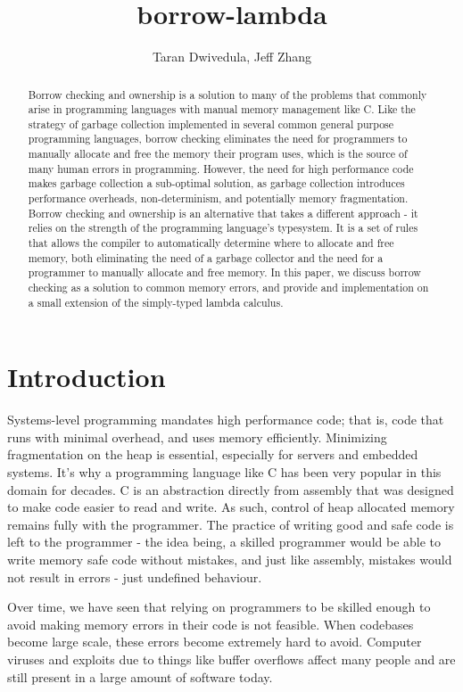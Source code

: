\documentclass[letterpaper,11pt]{article}
\title{borrow-lambda}
\author{Taran Dwivedula, Jeff Zhang}
\begin{document}
\maketitle

\begin{abstract}
    Borrow checking and ownership is a solution to many of the problems that commonly arise in programming languages with manual memory management like C.
    Like the strategy of garbage collection implemented in several common general purpose programming languages, borrow checking eliminates the
    need for programmers to manually allocate and free the memory their program uses, which is the source of many human errors in programming.
    However, the need for high performance code makes garbage collection a sub-optimal solution, as garbage collection introduces performance
    overheads, non-determinism, and potentially memory fragmentation. Borrow checking and ownership is an alternative that takes a different
    approach - it relies on the strength of the programming language's typesystem. It is a set of rules that allows the compiler to
    automatically determine where to allocate and free memory, both eliminating the need of a garbage collector and the need for a programmer
    to manually allocate and free memory. In this paper, we discuss borrow checking as a solution to common memory errors, and provide
    and implementation on a small extension of the simply-typed lambda calculus.
\end{abstract}

\section{Introduction}
Systems-level programming mandates high performance code; that is, code that runs with minimal overhead, and uses memory efficiently. Minimizing
fragmentation on the heap is essential, especially for servers and embedded systems. It's why a programming language like C has been very popular
in this domain for decades. C is an abstraction directly from assembly that was
designed to make code easier to read and write. As such, control of heap allocated
memory remains fully with the programmer. The practice of writing good and safe code
is left to the programmer - the idea being, a skilled programmer would be able to write
memory safe code without mistakes, and just like assembly, mistakes would not result
in errors - just undefined behaviour.

Over time, we have seen that relying on programmers to be skilled enough to avoid
making memory errors in their code is not feasible. When codebases become large scale,
these errors become extremely hard to avoid. Computer viruses and exploits due to
things like buffer overflows affect many people and are still present in a large
amount of software today.
\end{document}
